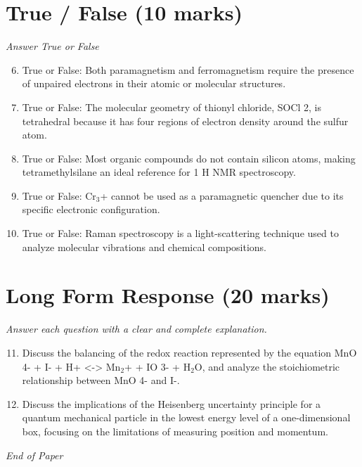 \documentclass[12pt]{article}
\begin{document}
\section*{True / False (10 marks)}
\textit{Answer True or False}
\begin{enumerate}[label=\arabic*.]
\setcounter{enumi}{5}
\item True or False: Both paramagnetism and ferromagnetism require the presence of unpaired electrons in their atomic or molecular structures.
\item True or False: The molecular geometry of thionyl chloride, SOCl 2, is tetrahedral because it has four regions of electron density around the sulfur atom.
\item True or False: Most organic compounds do not contain silicon atoms, making tetramethylsilane an ideal reference for 1 H NMR spectroscopy.
\item True or False: Cr$_{3}$+ cannot be used as a paramagnetic quencher due to its specific electronic configuration.
\item True or False: Raman spectroscopy is a light-scattering technique used to analyze molecular vibrations and chemical compositions.
\end{enumerate}

\section*{Long Form Response (20 marks)}
\textit{Answer each question with a clear and complete explanation.}
\begin{enumerate}[label=\arabic*.]
\setcounter{enumi}{10}
\item Discuss the balancing of the redox reaction represented by the equation MnO 4- + I- + H+ \textless{}-\textgreater{} Mn$_{2}$+ + IO 3- + H$_{2}$O, and analyze the stoichiometric relationship between MnO 4- and I-.
\item Discuss the implications of the Heisenberg uncertainty principle for a quantum mechanical particle in the lowest energy level of a one-dimensional box, focusing on the limitations of measuring position and momentum.
\end{enumerate}

\vfill
\noindent\textit{End of Paper}
\end{document}
